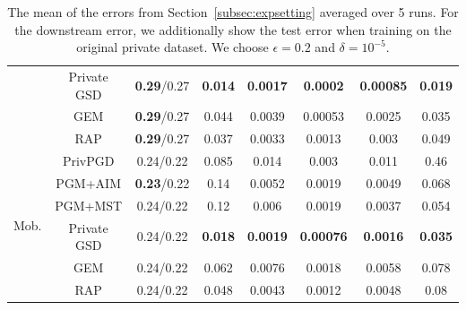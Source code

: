 \begin{table}[ht]
\begin{tabular}{cccccccc}
 & Private GSD&\textbf{0.29}/0.27 & \textbf{0.014} & \textbf{0.0017} & \textbf{0.0002} & \textbf{0.00085} & \textbf{0.019} \\
 & GEM&\textbf{0.29}/0.27 & 0.044 & 0.0039 & 0.00053 & 0.0025 & 0.035 \\
 & RAP&\textbf{0.29}/0.27 & 0.037 & 0.0033 & 0.0013 & 0.003 & 0.049 \\
\midrule \multirow{6}{*}{Mob. } & PrivPGD&0.24/0.22 & 0.085 & 0.014 & 0.003 & 0.011 & 0.46 \\
 & PGM+AIM&\textbf{0.23}/0.22 & 0.14 & 0.0052 & 0.0019 & 0.0049 & 0.068 \\
 & PGM+MST&0.24/0.22 & 0.12 & 0.006 & 0.0019 & 0.0037 & 0.054 \\
 & Private GSD&0.24/0.22 & \textbf{0.018} & \textbf{0.0019} & \textbf{0.00076} & \textbf{0.0016} & \textbf{0.035} \\
 & GEM&0.24/0.22 & 0.062 & 0.0076 & 0.0018 & 0.0058 & 0.078 \\
 & RAP&0.24/0.22 & 0.048 & 0.0043 & 0.0012 & 0.0048 & 0.08 \\
 \bottomrule
 \end{tabular}
 \caption{
    \small The mean of the errors from Section~\ref{subsec:expsetting}  averaged over 5 runs. For the downstream error, we additionally show the test error when training on the original private dataset. We choose $\epsilon =0.2$ and $\delta = 10^{-5}$.}
    \end{table}
 
